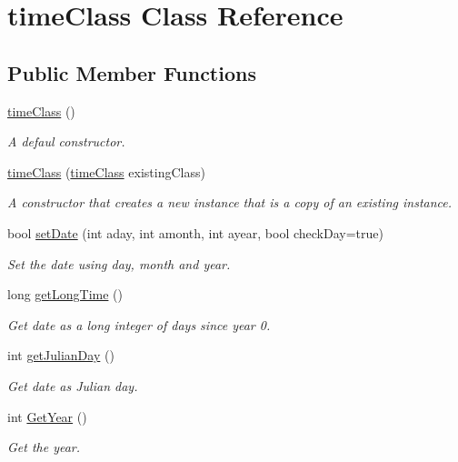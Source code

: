 \hypertarget{classtime_class}{}\section{time\+Class Class Reference}
\label{classtime_class}
\subsection*{Public Member Functions}
\begin{DoxyCompactItemize}
\item 
\mbox{\hyperlink{classtime_class_a38ce37ac715835464b8a4109bdb6510f}{time\+Class}} ()
\begin{DoxyCompactList}\small\item\em A defaul constructor. \end{DoxyCompactList}\item 
\mbox{\hyperlink{classtime_class_a2e9663011afb5016b7d5f19a0f3e620c}{time\+Class}} (\mbox{\hyperlink{classtime_class}{time\+Class}} existing\+Class)
\begin{DoxyCompactList}\small\item\em A constructor that creates a new instance that is a copy of an existing instance. \end{DoxyCompactList}\item 
bool \mbox{\hyperlink{classtime_class_a2549ae2d02d6ef32bb0afb19d5ddd45d}{set\+Date}} (int aday, int amonth, int ayear, bool check\+Day=true)
\begin{DoxyCompactList}\small\item\em Set the date using day, month and year. \end{DoxyCompactList}\item 
long \mbox{\hyperlink{classtime_class_ada28c20d7a0a54db849c7dd19638f6d5}{get\+Long\+Time}} ()
\begin{DoxyCompactList}\small\item\em Get date as a long integer of days since year 0. \end{DoxyCompactList}\item 
int \mbox{\hyperlink{classtime_class_a56c018f6d4c6da5e8bc48cc4c7229d86}{get\+Julian\+Day}} ()
\begin{DoxyCompactList}\small\item\em Get date as Julian day. \end{DoxyCompactList}\item 
int \mbox{\hyperlink{classtime_class_afe3b5cacaca30b738a82ceea12d9afda}{Get\+Year}} ()
\begin{DoxyCompactList}\small\item\em Get the year. \end{DoxyCompactList}\item 

\end{DoxyCompactItemize}
